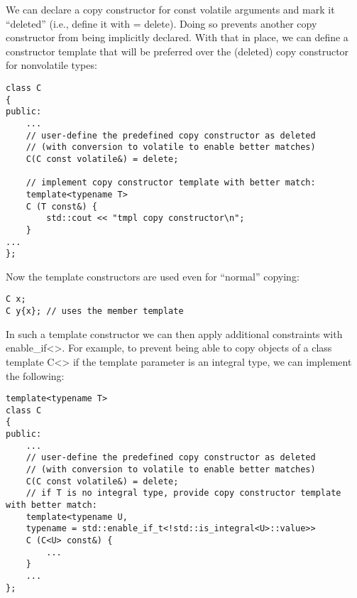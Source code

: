 We can declare a copy constructor for const volatile arguments and mark it “deleted” (i.e., define it with = delete). Doing so prevents another copy constructor from being implicitly declared. With that in place, we can define a constructor template that will be preferred over the (deleted) copy constructor for nonvolatile types:

\begin{lstlisting}[style=styleCXX]
class C
{
public:
	...
	// user-define the predefined copy constructor as deleted
	// (with conversion to volatile to enable better matches)
	C(C const volatile&) = delete;
	
	// implement copy constructor template with better match:
	template<typename T>
	C (T const&) {
		std::cout << "tmpl copy constructor\n";
	}
...
};
\end{lstlisting}

Now the template constructors are used even for “normal” copying:

\begin{lstlisting}[style=styleCXX]
C x;
C y{x}; // uses the member template
\end{lstlisting}

In such a template constructor we can then apply additional constraints with enable\_if<>. For example, to prevent being able to copy objects of a class template C<> if the template parameter is an integral type, we can implement the following:

\begin{lstlisting}[style=styleCXX]
template<typename T>
class C
{
public:
	...
	// user-define the predefined copy constructor as deleted
	// (with conversion to volatile to enable better matches)
	C(C const volatile&) = delete;
	// if T is no integral type, provide copy constructor template with better match:
	template<typename U,
	typename = std::enable_if_t<!std::is_integral<U>::value>>
	C (C<U> const&) {
		...
	}
	...
};
\end{lstlisting}












